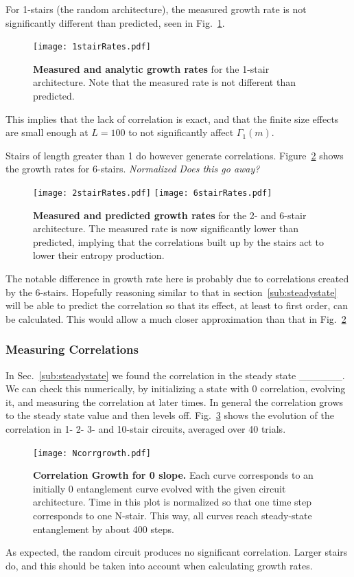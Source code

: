 For 1-stairs (the random architecture), the measured growth rate is not significantly different than predicted, seen in Fig.~\ref{fig:1stairRates}.
\begin{figure}
	\centering
	\texttt{[image: 1stairRates.pdf]}
	\caption{\textbf{Measured and analytic growth rates} for the 1-stair architecture. Note that the measured rate is not different than predicted.}
	\label{fig:1stairRates}
\end{figure}
This implies that the lack of correlation is exact, and that the finite size effects are small enough at $L=100$ to not significantly affect $\Gamma_1(m)$.

Stairs of length greater than 1 do however generate correlations. Figure~\ref{fig:6stairRates} shows the growth rates for 6-stairs. 
\emph{Normalized}
\emph{Does this go away?}
\begin{figure}
	\centering
	\texttt{[image: 2stairRates.pdf]}
	\texttt{[image: 6stairRates.pdf]}
	\caption{\textbf{Measured and predicted growth rates} for the 2- and 6-stair architecture. The measured rate is now significantly lower than predicted, implying that the correlations built up by the stairs act to lower their entropy production.}
	\label{fig:6stairRates}
\end{figure}
The notable difference in growth rate here is probably due to correlations created by the 6-stairs. Hopefully reasoning similar to that in section~\ref{sub:steadystate} will be able to predict the correlation so that its effect, at least to first order, can be calculated. This would allow a much closer approximation than that in Fig.~\ref{fig:6stairRates}

\subsubsection{Measuring Correlations}  \label{subsub:correlations}

In Sec.~\ref{sub:steadystate} we found the correlation in the steady state \_\_\_\_\_\_. We can check this numerically, by initializing a state with 0 correlation, evolving it, and measuring the correlation at later times. In general the correlation grows to the steady state value and then levels off. Fig.~\ref{fig:corrgrowth} shows the evolution of the correlation in 1- 2- 3- and 10-stair circuits, averaged over 40 trials.
\begin{figure}
	\centering
	\texttt{[image: Ncorrgrowth.pdf]}
	\caption{\textbf{Correlation Growth for 0 slope.} Each curve corresponds to an initially 0 entanglement curve evolved with the given circuit architecture. Time in this plot is normalized so that one time step corresponds to one N-stair. This way, all curves reach steady-state entanglement by about 400 steps.
	}
	\label{fig:corrgrowth}
\end{figure}
As expected, the random circuit produces no significant correlation. Larger stairs do, and this should be taken into account when calculating growth rates. 

